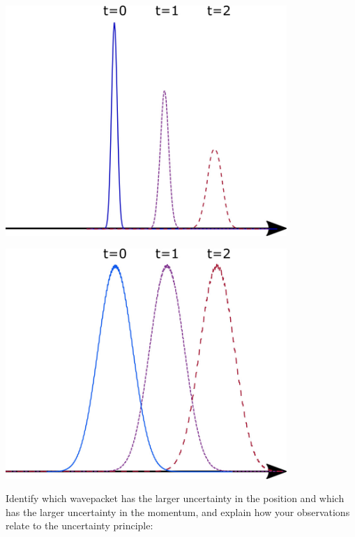 \begin{questions}
      	\vspace{0.2in}
	\begin{minipage}{0.5\textwidth}
	\centerline{\includegraphics[width=0.8\textwidth]{includes/wavepackets-FIGURES/prop1.jpg}}
	\end{minipage}
	\begin{minipage}{0.5\textwidth}
	\centerline{\includegraphics[width=0.8\textwidth]{includes/wavepackets-FIGURES/prop2.jpg}}
	\end{minipage}
	\vspace{0.1in}

Identify which wavepacket has the larger uncertainty in the position and which has the larger uncertainty in the momentum, and explain how your observations relate to the uncertainty principle:
	
	\vspace{3.25in}

\end{questions}
